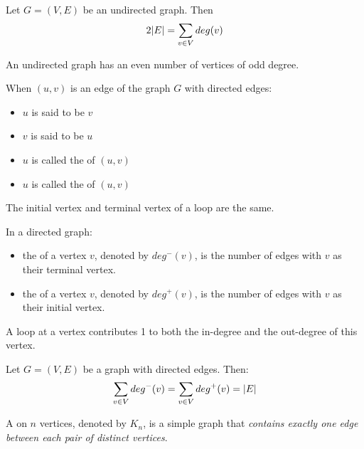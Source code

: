         \par Let $G = (V, E)$ be an undirected graph. Then
        \begin{equation}
            2|E| = \sum\limits _{v \in V} deg(v)
        \end{equation}
        \par An undirected graph has an even number of vertices of odd degree.

        \par When $(u, v)$ is an edge of the graph $G$ with directed edges:
        \begin{itemize}
            \item $u$ is said to be  $v$
            \item $v$ is said to be  $u$
            \item $u$ is called the  of $(u, v)$
            \item $u$ is called the  of $(u, v)$
        \end{itemize}
        \par The initial vertex and terminal vertex of a loop are the same.

        \par In a directed graph:
        \begin{itemize}
            \item the  of a vertex $v$, denoted by $deg^{-}(v)$, is the number
                of edges with $v$ as their terminal vertex.
            \item the  of a vertex $v$, denoted by $deg^{+}(v)$, is the number
                of edges with $v$ as their initial vertex.
        \end{itemize}
        \par A loop at a vertex contributes 1 to both the in-degree and the out-degree of this
        vertex.

        \par Let $G = (V, E)$ be a graph with directed edges. Then:
        \begin{equation}
            \sum\limits _{v \in V} deg^{-}(v) = \sum\limits _{v \in V} deg^{+}(v) = |E|
        \end{equation}

            \par A  on $n$ vertices, denoted by $K_{n}$, is a simple graph that
            \textit{contains exactly one edge between each pair of distinct vertices}.

